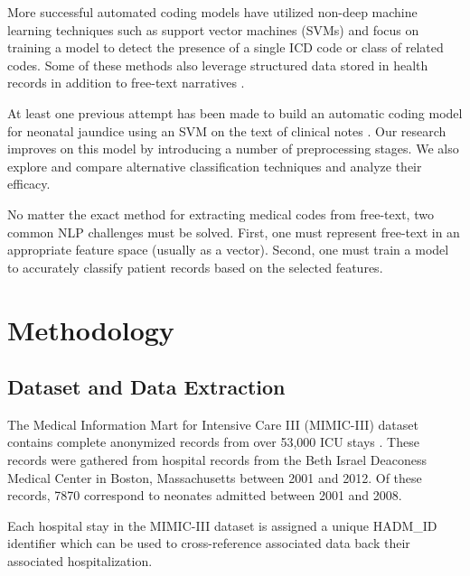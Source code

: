\documentclass[conference]{IEEEtran}
\begin{document}
More successful automated coding models have utilized non-deep machine learning techniques such as support vector machines (SVMs) \cite{Cortes} and focus on training a model to detect the presence of a single ICD code or class of related codes. Some of these methods also leverage structured data stored in health records in addition to free-text narratives \cite{Ferrao}.

At least one previous attempt has been made to build an automatic coding model for neonatal jaundice using an SVM on the text of clinical notes \cite{Marafino}. Our research improves on this model by introducing a number of preprocessing stages. We also explore and compare alternative classification techniques and analyze their efficacy.

No matter the exact method for extracting medical codes from free-text, two common NLP challenges must be solved. First, one must represent free-text in an appropriate feature space (usually as a vector). Second, one must train a model to accurately classify patient records based on the selected features. 

\section{Methodology}
\subsection{Dataset and Data Extraction}\label{AA}
The Medical Information Mart for Intensive Care III (MIMIC-III) dataset contains complete anonymized records from over 53,000 ICU stays \cite{Johnson}. These records were gathered from hospital records from the Beth Israel Deaconess Medical Center in Boston, Massachusetts between 2001 and 2012. Of these records, 7870 correspond to neonates admitted between 2001 and 2008. 

Each hospital stay in the MIMIC-III dataset is assigned a unique HADM\_ID identifier which can be used to cross-reference associated data back their associated hospitalization.
\end{document}
